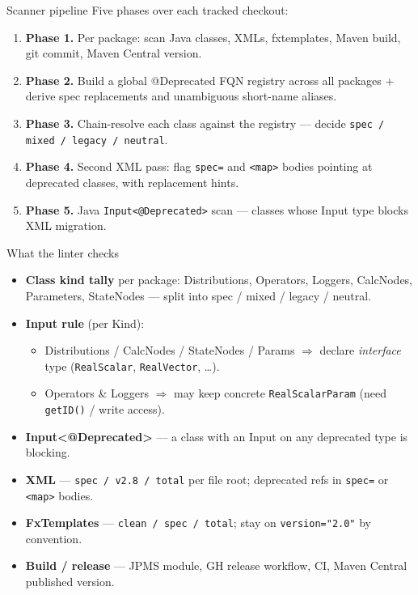 \documentclass[aspectratio=169]{beamer}
\begin{document}
\begin{frame}{Scanner pipeline}
  Five phases over each tracked checkout:
  \begin{enumerate}
    \item \textbf{Phase 1.} Per package: scan Java classes, XMLs, fxtemplates, Maven build, git commit, Maven Central version.
    \item \textbf{Phase 2.} Build a \alert{global @Deprecated FQN registry} across all packages + derive spec replacements and unambiguous short-name aliases.
    \item \textbf{Phase 3.} Chain-resolve each class against the registry --- decide \texttt{spec / mixed / legacy / neutral}.
    \item \textbf{Phase 4.} Second XML pass: flag \texttt{spec=} and \texttt{<map>} bodies pointing at deprecated classes, with replacement hints.
    \item \textbf{Phase 5.} Java \texttt{Input<@Deprecated>} scan --- classes whose Input type blocks XML migration.
  \end{enumerate}
\end{frame}

\begin{frame}{What the linter checks}
  \begin{itemize}
    \item \textbf{Class kind tally} per package: Distributions, Operators, Loggers, CalcNodes, Parameters, StateNodes --- split into spec / mixed / legacy / neutral.
    \item \textbf{Input rule} (per Kind):
      \begin{itemize}
        \item Distributions / CalcNodes / StateNodes / Params $\Rightarrow$ declare \emph{interface} type (\texttt{RealScalar}, \texttt{RealVector}, \ldots).
        \item Operators \& Loggers $\Rightarrow$ may keep concrete \texttt{RealScalarParam} (need \texttt{getID()} / write access).
      \end{itemize}
    \item \textbf{Input<@Deprecated>} --- a class with an Input on any deprecated type is blocking.
    \item \textbf{XML} --- \texttt{spec / v2.8 / total} per file root; deprecated refs in \texttt{spec=} or \texttt{<map>} bodies.
    \item \textbf{FxTemplates} --- \texttt{clean / spec / total}; stay on \texttt{version="2.0"} by convention.
    \item \textbf{Build / release} --- JPMS module, GH release workflow, CI, Maven Central published version.
  \end{itemize}
\end{frame}
\end{document}
